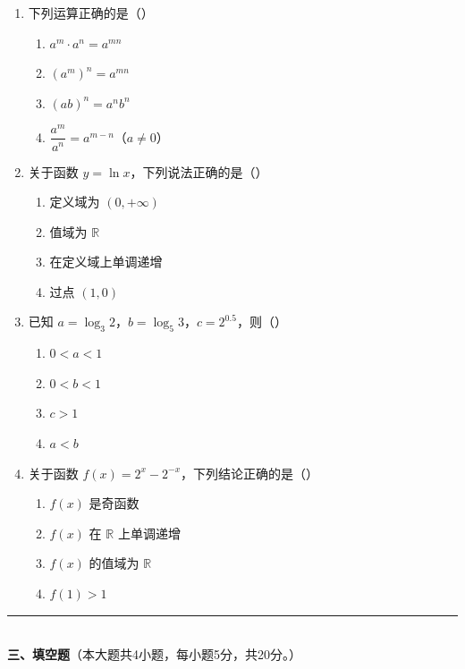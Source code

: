 \documentclass[12pt, a4paper]{ctexart}
\begin{document}
\begin{enumerate}[resume]
\item 下列运算正确的是（\quad）
  \begin{enumerate}[label=\Alph*., itemsep=0pt]
    \item $a^m\cdot a^n=a^{mn}$
    \item $(a^m)^n=a^{mn}$
    \item $(ab)^n=a^n b^n$
    \item $\dfrac{a^m}{a^n}=a^{m-n}$（$a\neq 0$）
  \end{enumerate}

\item 关于函数 $y=\ln x$，下列说法正确的是（\quad）
  \begin{enumerate}[label=\Alph*., itemsep=0pt]
    \item 定义域为 $(0,+\infty)$
    \item 值域为 $\mathbb{R}$
    \item 在定义域上单调递增
    \item 过点 $(1,0)$
  \end{enumerate}

\item 已知 $a=\log_3 2$，$b=\log_5 3$，$c=2^{0.5}$，则（\quad）
  \begin{enumerate}[label=\Alph*., itemsep=0pt]
    \item $0<a<1$
    \item $0<b<1$
    \item $c>1$
    \item $a<b$
  \end{enumerate}

\item 关于函数 $f(x)=2^x-2^{-x}$，下列结论正确的是（\quad）
  \begin{enumerate}[label=\Alph*., itemsep=0pt]
    \item $f(x)$ 是奇函数
    \item $f(x)$ 在 $\mathbb{R}$ 上单调递增
    \item $f(x)$ 的值域为 $\mathbb{R}$
    \item $f(1)>1$
  \end{enumerate}
\end{enumerate}

\vspace{6pt}

\noindent\rule{\textwidth}{0.4pt}\\[2pt]
{\large\bfseries 三、填空题}（本大题共4小题，每小题5分，共20分。）
\end{document}
